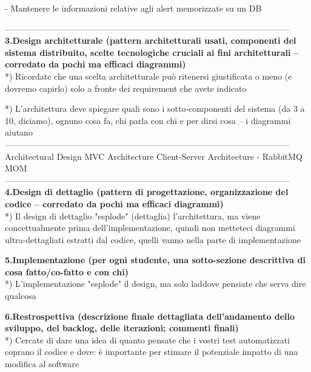 \documentclass[10pt,english]{article}
\begin{document}
- Mantenere le informazioni relative agli alert memorizzate su un DB



-----------------------------------------------------------------------------------------------------\\
\textbf{3.Design architetturale (pattern architetturali usati, componenti del sistema distribuito, scelte tecnologiche cruciali ai fini architetturali -- corredato da pochi ma efficaci diagrammi)} \\

*) Ricordate che una scelta architetturale può ritenersi giustificata o meno (e dovremo capirlo) solo a fronte dei requirement che avete indicato

*) L'architettura deve spiegare quali sono i sotto-componenti del sistema (da 3 a 10, diciamo), ognuno cosa fa, chi parla con chi e per dirsi cosa -- i diagrammi aiutano
\\-----------------------------------------------------------------------------------------------------\\
 Architectural Design
MVC Architecture
Client-Server Architecture
 - RabbitMQ MOM 
\\-----------------------------------------------------------------------------------------------------\\

\textbf{4.Design di dettaglio (pattern di progettazione, organizzazione del codice -- corredato da pochi ma efficaci diagrammi)} \\

*) Il design di dettaglio "esplode" (dettaglia) l'architettura, ma viene concettualmente prima dell'implementazione, quindi non metteteci diagrammi ultra-dettagliati estratti dal codice, quelli vanno nella parte di implementazione

\textbf{5.Implementazione (per ogni studente, una sotto-sezione descrittiva di cosa fatto/co-fatto e con chi)} \\

*) L'implementazione "esplode" il design, ma solo laddove pensiate che serva dire qualcosa

\textbf{6.Restrospettiva (descrizione finale dettagliata dell'andamento dello sviluppo, del backlog, delle iterazioni; commenti finali)} \\

*) Cercate di dare una idea di quanto pensate che i vostri test automatizzati coprano il codice e dove: è importante per stimare il potenziale impatto di una modifica al software\\
\end{document}
